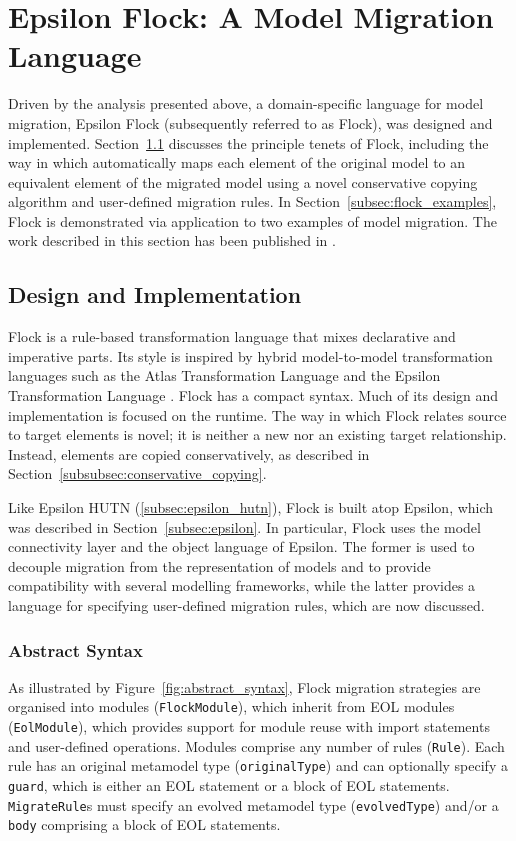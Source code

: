 
\section{Epsilon Flock: A Model Migration Language}
\label{sec:flock}
Driven by the analysis presented above, a domain-specific language for model migration, Epsilon Flock (subsequently referred to as Flock), was designed and implemented. Section~\ref{subsec:flock_design} discusses the principle tenets of Flock, including the way in which automatically maps each element of the original model to an equivalent element of the migrated model using a novel conservative copying algorithm and user-defined migration rules. In Section~\ref{subsec:flock_examples}, Flock is demonstrated via application to two examples of model migration. The work described in this section has been published in \cite{rose10flock}.


\subsection{Design and Implementation}
\label{subsec:flock_design}
Flock is a rule-based transformation language that mixes declarative and imperative parts. Its style is inspired by hybrid model-to-model transformation languages such as the Atlas Transformation Language \cite{jouault05transforming} and the Epsilon Transformation Language \cite{kolovos08etl}. Flock has a compact syntax. Much of its design and implementation is focused on the runtime. The way in which Flock relates source to target elements is novel; it is neither a new nor an existing target relationship. Instead, elements are copied conservatively, as described in Section~\ref{subsubsec:conservative_copying}.

Like Epsilon HUTN (\ref{subsec:epsilon_hutn}), Flock is built atop Epsilon, which was described in Section~\ref{subsec:epsilon}. In particular, Flock uses the model connectivity layer and the object language of Epsilon. The former is used to decouple migration from the representation of models and to provide compatibility with several modelling frameworks, while the latter provides a language for specifying user-defined migration rules, which are now discussed. 

\subsubsection{Abstract Syntax}
\label{subsubsec:abstract_syntax}
As illustrated by Figure~\ref{fig:abstract_syntax}, Flock migration strategies are organised into modules (\texttt{Fl\-ockMo\-du\-le}), which inherit from EOL modules (\texttt{Eo\-lMod\-ule}), which provides support for module reuse with import statements and user-defined operations. Modules comprise any number of rules (\texttt{Ru\-le}). Each rule has an original metamodel type (\texttt{or\-ig\-in\-alTy\-pe}) and can optionally specify a \texttt{gu\-ard}, which is either an EOL statement or a block of EOL statements. \texttt{Mi\-gr\-ateRu\-le}s must specify an evolved metamodel type (\texttt{ev\-ol\-vedTy\-pe}) and/or a \texttt{bo\-dy} comprising a block of EOL statements.


